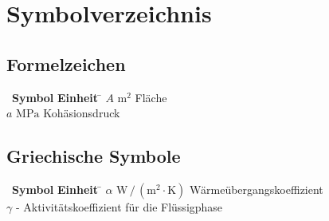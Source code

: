 
\chapter*{Symbolverzeichnis}\thispagestyle{fancy}

\section*{Formelzeichen}

\begin{tabbing}
\ \= \textbf{Symbol} \hspace{0.5cm} \= \textbf{Einheit} \hspace{1.5cm} \= \kill
\> $A$ \> $\mathrm{m^{2}}$ \> Fläche \\
\> $a$ \> $\mathrm{MPa}$ \> Kohäsionsdruck \\
\end{tabbing}

\section*{Griechische Symbole}

\begin{tabbing}
\ \= \textbf{Symbol} \hspace{0.5cm} \= \textbf{Einheit} \hspace{1.5cm} \= \kill
\> $\alpha$ \> $\mathrm{W\,/\,(m^{2} \cdot K)}$ \> Wärmeübergangskoeffizient\\
\> $\gamma$ \> - \> Aktivitätskoeffizient für die Flüssigphase \\
\end{tabbing}